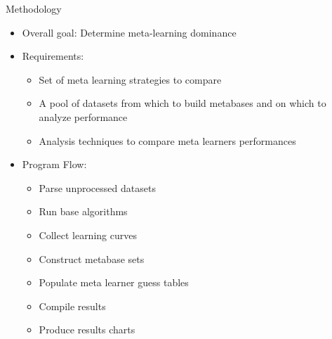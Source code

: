 \documentclass{beamer}
\begin{document}
\begin{frame}{Methodology}
  \begin{itemize}
  \item Overall goal: Determine meta-learning dominance
  \item Requirements:
     \begin{itemize}
        \item Set of meta learning strategies to compare
        \item A pool of datasets from which to build metabases
              and on which to analyze performance
        \item Analysis techniques to compare meta learners performances
     \end{itemize}
  \item Program Flow:
    \begin{itemize}
       \item Parse unprocessed datasets
       \item Run base algorithms
       \item Collect learning curves
       \item Construct metabase sets
       \item Populate meta learner guess tables
       \item Compile results
       \item Produce results charts
    \end{itemize}
  \end{itemize}
\end{frame}
\end{document}
